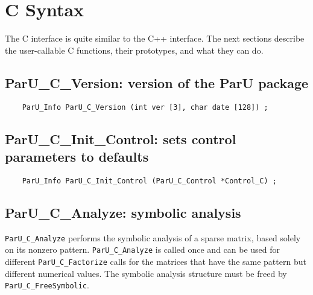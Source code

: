 \documentclass[12pt]{article}
\begin{document}
\section{C Syntax}

The C interface is quite similar to the C++ interface.  The next sections
describe the user-callable C functions, their prototypes, and what they can do.

\subsection{{\sf ParU\_C\_Version}: version of the ParU package}

    {\footnotesize
    \begin{verbatim}
    ParU_Info ParU_C_Version (int ver [3], char date [128]) ; \end{verbatim} }

\subsection{{\sf ParU\_C\_Init\_Control}: sets control parameters to defaults}

    {\footnotesize
    \begin{verbatim}
    ParU_Info ParU_C_Init_Control (ParU_C_Control *Control_C) ; \end{verbatim} }

\subsection{{\sf ParU\_C\_Analyze}: symbolic analysis}

    \verb'ParU_C_Analyze' performs the symbolic analysis of a sparse
        matrix, based solely on its nonzero pattern.  \verb'ParU_C_Analyze' is
        called once and can be used for different \verb'ParU_C_Factorize' calls
        for the matrices that have the same pattern but different numerical
        values.  The symbolic analysis structure must be freed by
        \verb'ParU_C_FreeSymbolic'.
\end{document}
